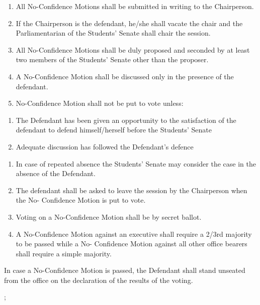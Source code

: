\begin{enumerate}
  \begin{enumerate}
  \def\labelenumii{\alph{enumii}.}
  \item
    All No-Confidence Motions shall be submitted in writing to the
    Chairperson.
  \item
    If the Chairperson is the defendant, he/she shall vacate the chair
    and the Parliamentarian of the Students' Senate shall chair the
    session.
  \item
    All No-Confidence Motions shall be duly proposed and seconded by at
    least two members of the Students' Senate other than the proposer.
  \item
    A No-Confidence Motion shall be discussed only in the presence of
    the defendant.
  \item
    No-Confidence Motion shall not be put to vote unless:
  \end{enumerate}

  \begin{enumerate}
  \def\labelenumii{\arabic{enumii}.}
  \itemsep1pt\parskip0pt
  \item
    The Defendant has been given an opportunity to the satisfaction of
    the defendant to defend himself/herself before the Students' Senate
  \item
    Adequate discussion has followed the Defendant's defence
  \end{enumerate}

  \begin{enumerate}
  \def\labelenumii{\alph{enumii}.}
  \setcounter{enumii}{5}
  \item
    In case of repeated absence the Students' Senate may consider the
    case in the absence of the Defendant.
  \item
    The defendant shall be asked to leave the session by the Chairperson
    when the No- Confidence Motion is put to vote.
  \item
    Voting on a No-Confidence Motion shall be by secret ballot.
  \item
    A No-Confidence Motion against an executive shall require a 2/3rd
    majority to be passed while a No- Confidence Motion against all
    other office bearers shall require a simple majority.
  \end{enumerate}

  In case a No-Confidence Motion is passed, the Defendant shall stand
  unseated from the office on the declaration of the results of the
  voting.
\end{enumerate}
;